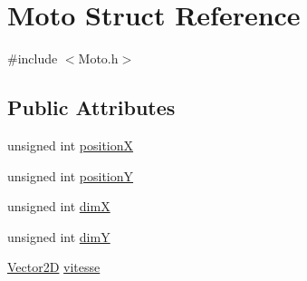 \hypertarget{structMoto}{\section{Moto Struct Reference}
\label{structMoto}
}


{\ttfamily \#include $<$Moto.\-h$>$}

\subsection*{Public Attributes}
\begin{DoxyCompactItemize}
\item 
unsigned int \hyperlink{structMoto_a8fb2706203929b02c7c37fe4fef32ca2}{position\-X}
\item 
unsigned int \hyperlink{structMoto_ae2f9cc8d1f0cf2fb58b14d827138e11e}{position\-Y}
\item 
unsigned int \hyperlink{structMoto_aeff28579dc6195025dec40699a1ab8bf}{dim\-X}
\item 
unsigned int \hyperlink{structMoto_a4078dd1449ea7b14d9edf4f2faf71c62}{dim\-Y}
\item 
\hyperlink{structVector2D}{Vector2\-D} \hyperlink{structMoto_aa5fe56a5edee7ea8f7501e4ed05de8cc}{vitesse}
\end{DoxyCompactItemize}


